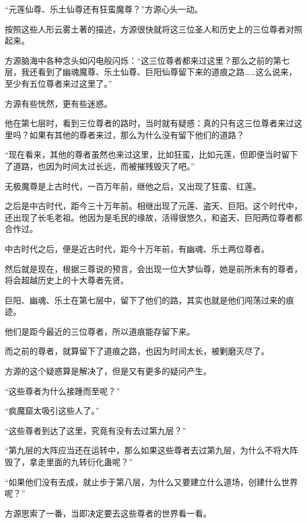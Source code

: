 
\begin{this_body}



“元莲仙尊、乐土仙尊还有狂蛮魔尊？”方源心头一动。

按照这些人形云雾土著的描述，方源很快就将这三位圣人和历史上的三位尊者对照起来。

方源脑海中各种念头如闪电般闪烁：“这三位尊者都来过这里？那么之前的第七层，我还看到了幽魂魔尊、乐土仙尊、巨阳仙尊留下来的道痕之路……这么说来，至少有五位尊者来过这里了。”

方源有些恍然，更有些迷惑。

他在第七层时，看到三位尊者的路时，当时就有疑惑：真的只有这三位尊者来过这里吗？如果有其他的尊者来过，那么为什么没有留下他们的道路？

“现在看来，其他的尊者虽然也来过这里，比如狂蛮，比如元莲，但即便当时留下了道路，也因为时间太过长远，而被摧残毁灭了吧。”

无极魔尊是上古时代，一百万年前，继他之后，又出现了狂蛮、红莲。

之后是中古时代，距今三十万年前。相继出现了元莲、盗天、巨阳。这个时代中，还出现了长毛老祖。他因为是毛民的缘故，活得很悠久，和盗天、巨阳两位尊者都合作过。

中古时代之后，便是近古时代，距今十万年前，有幽魂、乐土两位尊者。

然后就是现在，根据三尊说的预言，会出现一位大梦仙尊，她是前所未有的尊者，将会超越历史上的十大尊者先贤。

巨阳、幽魂、乐土在第七层中，留下了他们的路，其实也就是他们闯荡过来的痕迹。

他们是距今最近的三位尊者，所以道痕能存留下来。

而之前的尊者，就算留下了道痕之路，也因为时间太长，被剿磨灭尽了。

方源的这个疑惑算是解决了，但是又有更多的疑问产生。

“这些尊者为什么接踵而至呢？”

“疯魔窟太吸引这些人了。”

“这些尊者到达了这里，究竟有没有去过第九层？”

“第九层的大阵应当还在运转中，那么如果这些尊者去过第九层，为什么不将大阵毁了，拿走里面的九转衍化蛊呢？”

“如果他们没有去成，就止步于第八层，为什么又要建立什么道场，创建什么世界呢？”

方源思索了一番，当即决定要去这些尊者的世界看一看。


\end{this_body}
